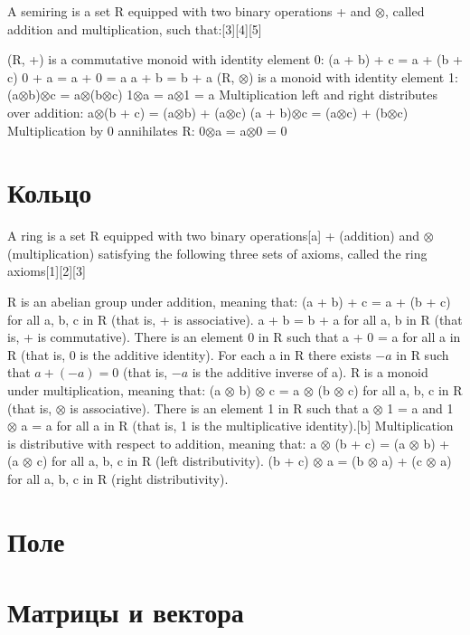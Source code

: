 A semiring is a set R equipped with two binary operations + and $\otimes$, called addition and multiplication, such that:[3][4][5]

(R, +) is a commutative monoid with identity element 0:
(a + b) + c = a + (b + c)
0 + a = a + 0 = a
a + b = b + a
(R, $\otimes$) is a monoid with identity element 1:
(a$\otimes$b)$\otimes$c = a$\otimes$(b$\otimes$c)
1$\otimes$a = a$\otimes$1 = a
Multiplication left and right distributes over addition:
a$\otimes$(b + c) = (a$\otimes$b) + (a$\otimes$c)
(a + b)$\otimes$c = (a$\otimes$c) + (b$\otimes$c)
Multiplication by 0 annihilates R:
0$\otimes$a = a$\otimes$0 = 0


\section{Кольцо}


A ring is a set R equipped with two binary operations[a] + (addition) and $\otimes$ (multiplication) satisfying the following three sets of axioms, called the ring axioms[1][2][3]

R is an abelian group under addition, meaning that:
(a + b) + c = a + (b + c) for all a, b, c in R   (that is, + is associative).
a + b = b + a for all a, b in R   (that is, + is commutative).
There is an element 0 in R such that a + 0 = a for all a in R   (that is, 0 is the additive identity).
For each a in R there exists $-a$ in R such that $a + (-a) = 0$   (that is, $-a$ is the additive inverse of a).
R is a monoid under multiplication, meaning that:
(a $\otimes$ b) $\otimes$ c = a $\otimes$ (b $\otimes$ c) for all a, b, c in R   (that is, $\otimes$ is associative).
There is an element 1 in R such that a $\otimes$ 1 = a and 1 $\otimes$ a = a for all a in R   (that is, 1 is the multiplicative identity).[b]
Multiplication is distributive with respect to addition, meaning that:
a $\otimes$ (b + c) = (a $\otimes$ b) + (a $\otimes$ c) for all a, b, c in R   (left distributivity).
(b + c) $\otimes$ a = (b $\otimes$ a) + (c $\otimes$ a) for all a, b, c in R   (right distributivity).


\section{Поле}

\section{Матрицы и вектора}

